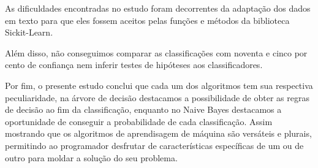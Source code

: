 \documentclass[preprint,12pt,times]{elsarticle}
\begin{document}
	As dificuldades encontradas no estudo foram decorrentes da adaptação dos dados em texto para que eles fossem aceitos pelas funções e métodos da biblioteca Sickit-Learn.
	
	Além disso, não conseguimos comparar as classificações com noventa e cinco por cento de confiança nem inferir testes de hipóteses aos classificadores.
	
	Por fim, o presente estudo conclui que cada um dos algoritmos tem sua respectiva peculiaridade, na árvore de decisão destacamos a possibilidade de obter as regras de decisão ao fim da classificação, enquanto no Naive Bayes destacamos a oportunidade de conseguir a probabilidade de cada classificação. Assim mostrando que os algoritmos de aprendisagem de máquina são versáteis e plurais, permitindo ao programador desfrutar de características específicas de um ou de outro para moldar a solução do seu problema.
		
	
	
\end{document}

